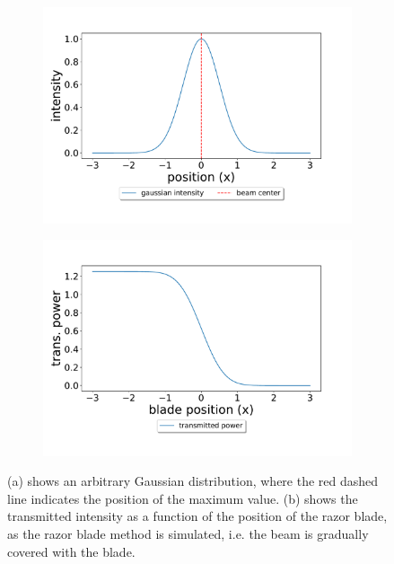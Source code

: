 \begin{figure}[h!]
    \centering
    \begin{subfigure}[b]{0.49\textwidth}
        \includegraphics[width=\textwidth]{figures/arbitrary_gaussian.pdf}
        \caption{}
        \label{fig:arb_gaussian}
    \end{subfigure}
    \begin{subfigure}[b]{0.49\textwidth}
        \includegraphics[width=\textwidth]{figures/razor_blade_err_function.pdf}
        \caption{}
        \label{fig:razor_blade}
    \end{subfigure}
    \caption{(a) shows an arbitrary Gaussian distribution, where the red dashed line indicates the position of the maximum value. (b) shows the transmitted intensity as a function of the position of the razor blade, as the razor blade method is simulated, i.e. the beam is gradually covered with the blade.}
    \label{fig:razor_blade_method}
\end{figure}

